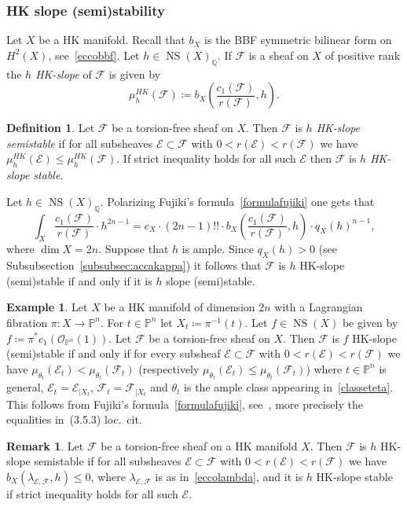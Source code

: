 \documentclass[11pt]{amsart}
\newcommand{\PP}{{\mathbb P}}
\newcommand{\QQ}{{\mathbb Q}}
\let\mathcal\mathscr
\def\cE{\mathcal{E}}
\def\cF{\mathcal{F}}
\def\cO{\mathcal{O}}
\DeclareMathOperator{\NS}{NS}
\theoremstyle{definition}
\newtheorem{dfn}[lmm]{Definition}
\newtheorem{rmk}[lmm]{Remark}
\newtheorem{expl}[lmm]{Example}
\theoremstyle{remark}
\begin{document}
\subsubsection{HK slope (semi)stability}
%
Let $X$ be a HK manifold. Recall that $b_X$ is the BBF symmetric bilinear form on $H^2(X)$, see~\eqref{eccobbf}. Let $h\in\NS(X)_{\QQ}$.   If $\cF$ is a sheaf on $X$ of positive rank the \emph{$h$ HK-slope} of $\cF$ is given by
%
\begin{equation}
%
\mu_h^{HK}(\cF)\coloneqq b_X\left(\frac{c_1(\cF)}{r(\cF)}, h\right).
%
\end{equation}
%
%
\begin{dfn}\label{dfn:stabnef}
%
Let $\cF$  be a torsion-free sheaf on $X$. Then $\cF$ is \emph{$h$ HK-slope semistable} if for all  subsheaves $\cE\subset\cF$ with $0<r(\cE)<r(\cF)$ we have $\mu_h^{HK}(\cE)\le \mu_h^{HK}(\cF)$.
If strict inequality holds for all such $\cE$ then $\cF$ is \emph{$h$  HK-slope stable}. 
%
\end{dfn}
%
Let $h\in\NS(X)_{\QQ}$. Polarizing Fujiki's formula~\eqref{formulafujiki} one gets that 
%
\begin{equation*}
%
\int_X \frac{c_1(\cF)}{r(\cF)}\cdot h^{2n-1}=c_X  \cdot(2n-1)!! \cdot b_X\left(\frac{c_1(\cF)}{r(\cF)},h\right)\cdot q_X(h)^{n-1},
%
\end{equation*}
%
where $\dim X=2n$. Suppose that $h$ is ample. Since $q_X(h)>0$ (see Subsubsection~\ref{subsubsec:accakappa}) it follows that $\cF$ is  $h$ HK-slope (semi)stable   if and only if it is $h$ slope (semi)stable. 
%
\begin{expl}\label{expl:hkstablag}
%
Let $X$ be a  HK manifold of dimension $2n$ with a Lagrangian fibration $\pi\colon X\to\PP^n$. For $t\in\PP^n$ let $X_t\coloneqq \pi^{-1}(t)$. Let 
$f\in\NS(X)$ be given by $f\coloneqq\pi^{*}c_1(\cO_{\PP^n}(1))$.  
Let $\cF$  be a torsion-free sheaf  on $X$. Then $\cF$ is $f$ HK-slope (semi)stable   if and only if  for every subsheaf $\cE\subset\cF$ with $0<r(\cE)<r(\cF)$ we have 
$\mu_{\theta_t}(\cE_t)<\mu_{\theta_t}(\cF_t)$ (respectively $\mu_{\theta_t}(\cE_t)\le\mu_{\theta_t}(\cF_t)$)  where $t\in\PP^n$ is general, 
$\cE_t=\cE_{|X_t}$, 
$\cF_t=\cF_{|X_t}$ and $\theta_t$ is the ample class appearing in~\eqref{classeteta}. This follows from Fujiki's formula~\eqref{formulafujiki}, see~\cite[Lemma~3.11]{og:fascimod}, more precisely the equalities in~(3.5.3) loc.~cit. 
\end{expl}
%
%
\begin{rmk}\label{rmk:pazzagioia}
%
Let $\cF$ be a torsion-free sheaf on a HK manifold $X$.
Then $\cF$  is $h$ HK-slope semistable if for all  subsheaves $\cE\subset\cF$ with 
$0<r(\cE)<r(\cF)$ we have 
$b_X(\lambda_{\cE,\cF},h)\le 0$, where $\lambda_{\cE,\cF}$ is as in~\eqref{eccolambda}, and it is $h$ HK-slope stable if strict inequality holds for all such $\cE$. 
%
\end{rmk}
%
%
\end{document}

